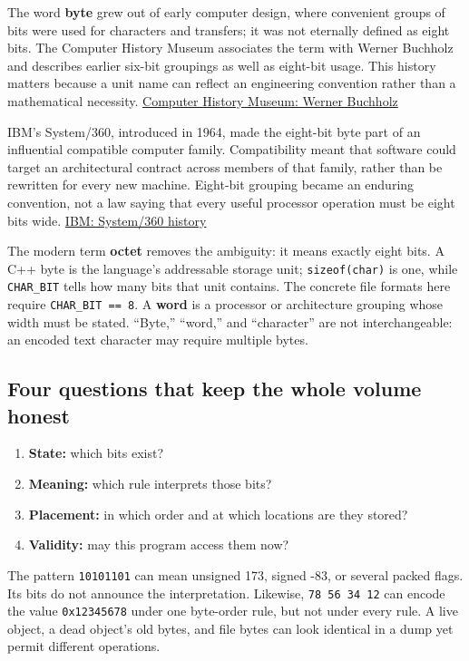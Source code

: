 The word \textbf{byte} grew out of early computer design, where convenient groups of bits were used for characters and transfers; it was not eternally defined as eight bits. The Computer History Museum associates the term with Werner Buchholz and describes earlier six-bit groupings as well as eight-bit usage. This history matters because a unit name can reflect an engineering convention rather than a mathematical necessity. \href{https://www.computerhistory.org/tdih/october/24/}{Computer History Museum: Werner Buchholz}

IBM's System/360, introduced in 1964, made the eight-bit byte part of an influential compatible computer family. Compatibility meant that software could target an architectural contract across members of that family, rather than be rewritten for every new machine. Eight-bit grouping became an enduring convention, not a law saying that every useful processor operation must be eight bits wide. \href{https://www.ibm.com/history/system-360}{IBM: System/360 history}

The modern term \textbf{octet} removes the ambiguity: it means exactly eight bits. A C++ byte is the language's addressable storage unit; \texttt{sizeof(char)} is one, while \texttt{CHAR\_BIT} tells how many bits that unit contains. The concrete file formats here require \texttt{CHAR\_BIT\ ==\ 8}. A \textbf{word} is a processor or architecture grouping whose width must be stated. ``Byte,'' ``word,'' and ``character'' are not interchangeable: an encoded text character may require multiple bytes.

\subsection{Four questions that keep the whole volume honest}\label{05-engine-i-ch001-four-questions-that-keep-the-whole-volume-honest}

\begin{enumerate}
\def\labelenumi{\arabic{enumi}.}
\tightlist
\item
  \textbf{State:} which bits exist?
\item
  \textbf{Meaning:} which rule interprets those bits?
\item
  \textbf{Placement:} in which order and at which locations are they stored?
\item
  \textbf{Validity:} may this program access them now?
\end{enumerate}

The pattern \texttt{10101101} can mean unsigned 173, signed -83, or several packed flags. Its bits do not announce the interpretation. Likewise, \texttt{78\ 56\ 34\ 12} can encode the value \texttt{0x12345678} under one byte-order rule, but not under every rule. A live object, a dead object's old bytes, and file bytes can look identical in a dump yet permit different operations.

